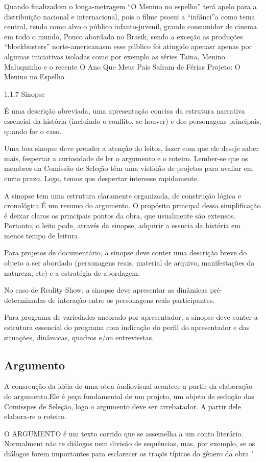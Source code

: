 Quando finalizadom o longa-metragem “O Menino no espelho” terá apelo para a distribuição nacional e internacional, pois o filme psosui a “infânci”a como tema central,  tendo como alvo o público infanto-juvenil, grande consumidor de cinema em todo o mundo, Pouco abordado no Brasik, sendo a exceção as produções “blockbusters” norte-americanasm esse público foi atingido apenasr apenas   por algumas iniciativas isoladas como por exemplo as séries Taina, Menino Maluquinho e o recente O Ano Que Meus Pais Saíram de Férias
Projeto: O Menino no Espelho

1.1.7 Sinopse

É uma descrição abreviada, uma apresentação concisa da estrutura narrativa essencial da história (incluindo o conflito, se houver) e dos personagens principais, quando for o caso. 

Uma boa sinopse deve prender a atenção do leitor, fazer com que ele deseje saber mais, fespertar a curiosidade de ler o argumento e o roteiro. Lember-se que os membres da Comissão de Seleção têm uma vistidão de projetos para avaliar em curto prazo. Logo, temos que despertar interesse rapidamente.

A sinopse tem uma estrutura claramente organizada, de construção lógica e cronológica.É um resumo do argumento. O propósito principal dessa simplificação é deixar claros os principais pontos da obra, que usualmente são extensos. Portanto, o leito pode, através da sinopse, adquirir a essncia da história em menos tempo de leitura.

Para projetos de documentário, a sinopse deve conter uma descrição breve do objeto a ser abordado (personagens reais, material de arquivo, manifestações da natureza, etc) e a estratégia de abordagem.

No caso de Reality Show, a sinopse deve apresentar as dinâmicas pré-determinadas de interação entre os personagens reais participantes.

Para programa de variedades ancorado por apresentador, a sinopse deve conter a estrutura essencial do programa com indicação do perfil do apresentador e das situações, dinâmicas, quadros e/ou entrevisstas.

\subsection{Argumento}

A consreução da idéia de uma obra áudiovisual acontece a partir da elaboração
 do argumento.Ele é peça fundamental de um projeto, um objeto de sedução das Comisspes de Seleção, logo o argumento deve ser arrebatador. A partir dele elabora-re o roteiro.

O ARGUMENTO é um texto corrido que se assemelha a um conto literário. Normalment não te diálogos nem divisão de sequências, mas, por exemplo, se os diálogos forem importantes para esclarecer os traçõs típicos do gênero da obra
'

